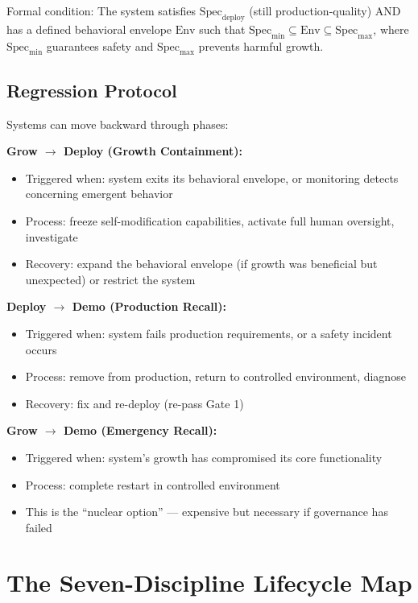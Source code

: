 \documentclass[11pt,a4paper]{article}
\begin{document}
\noindent Formal condition: The system satisfies $\mathrm{Spec}_{\mathrm{deploy}}$ (still production-quality) AND has a defined behavioral envelope $\mathrm{Env}$ such that $\mathrm{Spec}_{\min} \subseteq \mathrm{Env} \subseteq \mathrm{Spec}_{\max}$, where $\mathrm{Spec}_{\min}$ guarantees safety and $\mathrm{Spec}_{\max}$ prevents harmful growth.

\subsection{Regression Protocol}

Systems can move backward through phases:

\textbf{Grow $\rightarrow$ Deploy (Growth Containment):}
\begin{itemize}[nosep]
    \item Triggered when: system exits its behavioral envelope, or monitoring detects concerning emergent behavior
    \item Process: freeze self-modification capabilities, activate full human oversight, investigate
    \item Recovery: expand the behavioral envelope (if growth was beneficial but unexpected) or restrict the system
\end{itemize}

\textbf{Deploy $\rightarrow$ Demo (Production Recall):}
\begin{itemize}[nosep]
    \item Triggered when: system fails production requirements, or a safety incident occurs
    \item Process: remove from production, return to controlled environment, diagnose
    \item Recovery: fix and re-deploy (re-pass Gate 1)
\end{itemize}

\textbf{Grow $\rightarrow$ Demo (Emergency Recall):}
\begin{itemize}[nosep]
    \item Triggered when: system's growth has compromised its core functionality
    \item Process: complete restart in controlled environment
    \item This is the ``nuclear option'' --- expensive but necessary if governance has failed
\end{itemize}

\section{The Seven-Discipline Lifecycle Map}
\end{document}
